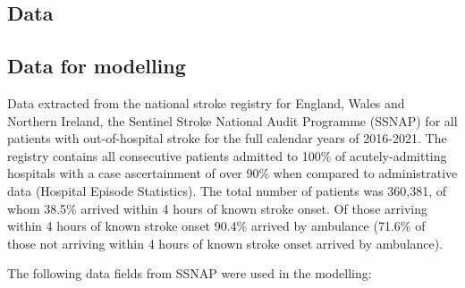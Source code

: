 \subsection{Data}

\subsection{Data for modelling}

Data extracted from the national stroke registry for England, Wales and Northern Ireland, the Sentinel Stroke National Audit Programme (SSNAP) for all patients with out-of-hospital stroke for the full calendar years of 2016-2021. The registry contains all consecutive patients admitted to 100\% of acutely-admitting hospitals with a case ascertainment of over 90\% when compared to administrative data (Hospital Episode Statistics). The total number of patients was 360,381, of whom 38.5\% arrived within 4 hours of known stroke onset. Of those arriving within 4 hours of known stroke onset 90.4\% arrived by ambulance (71.6\% of those not arriving within 4 hours of known stroke onset arrived by ambulance).

The following data fields from SSNAP were used in the modelling:

